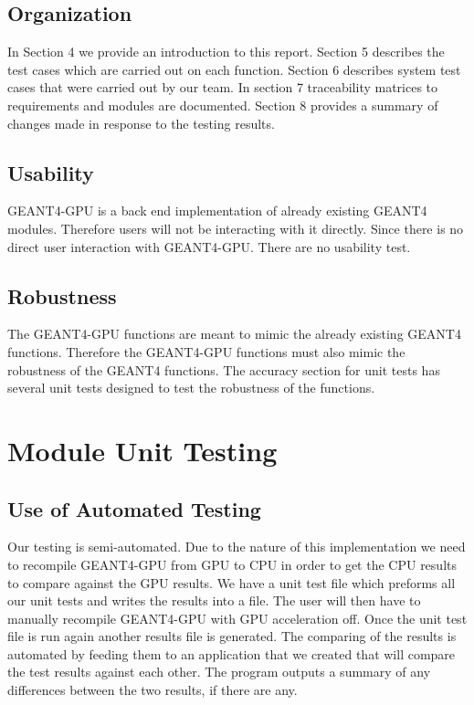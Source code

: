 \documentclass[12pt]{article}
\begin{document}
\subsection{Organization}
In Section 4 we provide an introduction to this report. Section 5 describes the test cases which are carried out on each function. Section 6 describes system test cases that were carried out by our team. In section 7 traceability matrices to requirements and modules are documented. Section 8 provides a summary of changes made in response to the testing results.
\subsection{Usability}
GEANT4-GPU is a back end implementation of already existing GEANT4 modules. Therefore users will not be interacting with it directly. Since there is no direct user interaction with GEANT4-GPU. There are no usability test. 
\subsection{Robustness}
The GEANT4-GPU functions are meant to mimic the already existing GEANT4 functions. Therefore the GEANT4-GPU functions must also mimic the robustness of the GEANT4 functions. The accuracy section for unit tests has several unit tests designed to test the robustness of the functions. 
\newpage
\section{Module Unit Testing}
\subsection{Use of Automated Testing}
Our testing is semi-automated. Due to the nature of this implementation we need to recompile GEANT4-GPU from GPU to CPU in order to get the CPU results to compare against the GPU results. We have a unit test file which preforms all our unit tests and writes the results into a file. The user will then have to manually recompile GEANT4-GPU with GPU acceleration off. Once the unit test file is run again another results file is generated. The comparing of the results is automated by feeding them to an application that we created that will compare the test results against each other. The program outputs a summary of any differences between the two results, if there are any.
\end{document}
